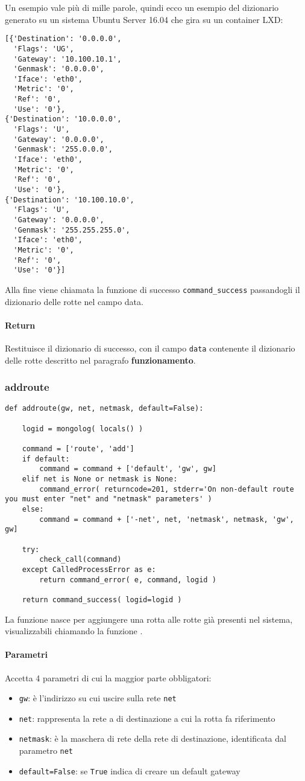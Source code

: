 \documentclass[11pt]{article}
\begin{document}
Un esempio vale più di mille parole, quindi ecco un esempio del dizionario generato su un sistema
Ubuntu Server 16.04 che gira su un container LXD:
\begin{lstlisting}
[{'Destination': '0.0.0.0',
  'Flags': 'UG',
  'Gateway': '10.100.10.1',
  'Genmask': '0.0.0.0',
  'Iface': 'eth0',
  'Metric': '0',
  'Ref': '0',
  'Use': '0'},
{'Destination': '10.0.0.0',
  'Flags': 'U',
  'Gateway': '0.0.0.0',
  'Genmask': '255.0.0.0',
  'Iface': 'eth0',
  'Metric': '0',
  'Ref': '0',
  'Use': '0'},
{'Destination': '10.100.10.0',
  'Flags': 'U',
  'Gateway': '0.0.0.0',
  'Genmask': '255.255.255.0',
  'Iface': 'eth0',
  'Metric': '0',
  'Ref': '0',
  'Use': '0'}]
\end{lstlisting}
Alla fine viene chiamata la funzione di successo \texttt{command\_success} passandogli il dizionario
delle rotte nel campo data.
\paragraph{Return}
Restituisce il dizionario di successo, con il campo \texttt{data} contenente il dizionario delle rotte
descritto nel paragrafo \textbf{funzionamento}.

\subsubsection{addroute}\label{addroute}
\begin{lstlisting}
def addroute(gw, net, netmask, default=False):

    logid = mongolog( locals() )

    command = ['route', 'add']
    if default:
        command = command + ['default', 'gw', gw]
    elif net is None or netmask is None:
        command_error( returncode=201, stderr='On non-default route you must enter "net" and "netmask" parameters' )
    else:
        command = command + ['-net', net, 'netmask', netmask, 'gw', gw]

    try:
        check_call(command)
    except CalledProcessError as e:
        return command_error( e, command, logid )

    return command_success( logid=logid )
\end{lstlisting}
La funzione nasce per aggiungere una rotta alle rotte già presenti nel sistema, visualizzabili chiamando
la funzione .
\paragraph{Parametri}
Accetta 4 parametri di cui la maggior parte obbligatori:
\begin{itemize}
	\item{\texttt{gw}: è l'indirizzo su cui uscire sulla rete \texttt{net}}
	\item{\texttt{net}: rappresenta la rete a di destinazione a cui la rotta fa riferimento}
	\item{\texttt{netmask}: è la maschera di rete della rete di destinazione, identificata dal parametro \texttt{net}}
	\item{\texttt{default=False}: se \texttt{True} indica di creare un default gateway} 
\end{itemize}
\end{document}
